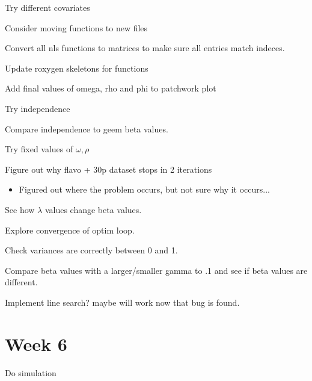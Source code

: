 \documentclass[10pt]{article}
\newcommand{\cmark}{\ding{51}}%
\newcommand{\done}{\rlap{$\square$}{\raisebox{2pt}{\large\hspace{1pt}\cmark}}%
\hspace{-2.5pt}}
\theoremstyle{definition}
\begin{document}
\begin{todolist}
  \item Try different covariates
  \item Consider moving functions to new files
  \item Convert all nls functions to matrices to make sure all entries match indeces.
  \item Update roxygen skeletons for functions
  \item Add final values of omega, rho and phi to patchwork plot
    \item[\done] Try independence
    \item Compare independence to geem beta values.
    \item Try fixed values of $\omega, \rho$
  \item[\done] Figure out why flavo + 30p dataset stops in 2 iterations
  \begin{itemize}
    \item Figured out where the problem occurs, but not sure why it occurs...
  \end{itemize}
  \item See how $\lambda$ values change beta values.
  \item Explore convergence of optim loop.
  \item Check variances are correctly between 0 and 1.
  \item Compare beta values with a larger/smaller gamma to .1 and see if beta values are different.
  \item Implement line search? maybe will work now that bug is found.

\end{todolist}


\newpage
\section{Week 6}

\begin{todolist}
  \item Do simulation
\end{todolist}
\end{document}

